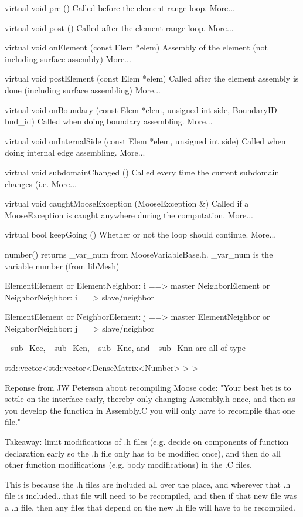 {virtual void 	pre ()
 	Called before the element range loop. More...

virtual void 	post ()
 	Called after the element range loop. More...

virtual void 	onElement (const Elem *elem)
 	Assembly of the element (not including surface assembly) More...

virtual void 	postElement (const Elem *elem)
 	Called after the element assembly is done (including surface assembling) More...

virtual void 	onBoundary (const Elem *elem, unsigned int side, BoundaryID bnd_id)
 	Called when doing boundary assembling. More...

virtual void 	onInternalSide (const Elem *elem, unsigned int side)
 	Called when doing internal edge assembling. More...

virtual void 	subdomainChanged ()
 	Called every time the current subdomain changes (i.e. More...

virtual void 	caughtMooseException (MooseException &)
 	Called if a MooseException is caught anywhere during the computation. More...

virtual bool 	keepGoing ()
 	Whether or not the loop should continue. More...

number() returns _var_num from MooseVariableBase.h. _var_num is the variable number (from libMesh)

ElementElement or ElementNeighbor: i ==> master
NeighborElement or NeighborNeighbor: i ==> slave/neighbor

ElementElement or NeighborElement: j ==> master
ElementNeighbor or NeighborNeighbor: j ==> slave/neighbor

_sub_Kee, _sub_Ken, _sub_Kne, and _sub_Knn are all of type

  std::vector<std::vector<DenseMatrix<Number> > >

Reponse from JW Peterson about recompiling Moose code: "Your best bet is to settle on the interface early, thereby only changing Assembly.h once, and then as you develop the function in Assembly.C you will only have to recompile that one file."

Takeaway: limit modifications of .h files (e.g. decide on components of function declaration early so the .h file only has to be modified once), and then do all other function modifications (e.g. body modifications) in the .C files.

This is because the .h files are included all over the place, and wherever that .h file is included...that file will need to be recompiled, and then if that new file was a .h file, then any files that depend on the new .h file will have to be recompiled.

}
